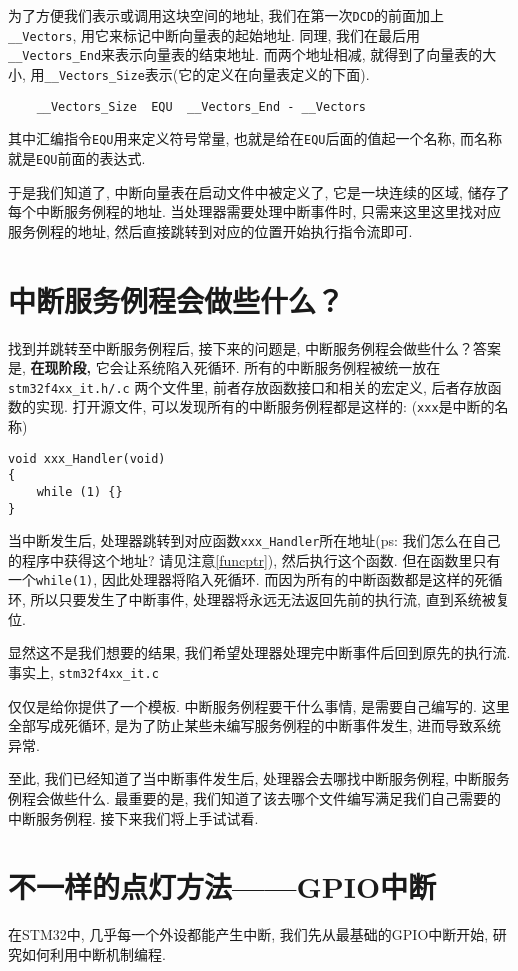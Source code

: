 为了方便我们表示或调用这块空间的地址, 我们在第一次\verb|DCD|的前面加上\verb|__Vectors|, 用它来标记中断向量表的起始地址. 同理, 我们在最后用\verb|__Vectors_End|来表示向量表的结束地址. 而两个地址相减, 就得到了向量表的大小, 用\verb|__Vectors_Size|表示(它的定义在向量表定义的下面).
\begin{lstlisting}
    __Vectors_Size  EQU  __Vectors_End - __Vectors
\end{lstlisting}
其中汇编指令\verb|EQU|用来定义符号常量, 也就是给在\verb|EQU|后面的值起一个名称, 而名称就是\verb|EQU|前面的表达式.

于是我们知道了, 中断向量表在启动文件中被定义了, 它是一块连续的区域, 储存了每个中断服务例程的地址. 当处理器需要处理中断事件时, 只需来这里这里找对应服务例程的地址, 然后直接跳转到对应的位置开始执行指令流即可.

\section{中断服务例程会做些什么？}
找到并跳转至中断服务例程后, 接下来的问题是, 中断服务例程会做些什么？答案是, \textbf{在现阶段,} 它会让系统陷入死循环. 所有的中断服务例程被统一放在 \verb|stm32f4xx_it.h/.c| 两个文件里, 前者存放函数接口和相关的宏定义, 后者存放函数的实现. 打开源文件, 可以发现所有的中断服务例程都是这样的:
(\verb|xxx|是中断的名称)
\begin{lstlisting}
void xxx_Handler(void)
{
    while (1) {}
}
\end{lstlisting}

当中断发生后, 处理器跳转到对应函数\verb|xxx_Handler|所在地址(ps: 我们怎么在自己的程序中获得这个地址? 请见注意\ref*{funcptr}), 然后执行这个函数. 但在函数里只有一个\verb|while(1)|, 因此处理器将陷入死循环. 而因为所有的中断函数都是这样的死循环, 所以只要发生了中断事件, 处理器将永远无法返回先前的执行流, 直到系统被复位.

显然这不是我们想要的结果, 我们希望处理器处理完中断事件后回到原先的执行流. 事实上, \verb|stm32f4xx_it.c|

\noindent 仅仅是给你提供了一个模板. 中断服务例程要干什么事情, 是需要自己编写的. 这里全部写成死循环, 是为了防止某些未编写服务例程的中断事件发生, 进而导致系统异常.

至此, 我们已经知道了当中断事件发生后, 处理器会去哪找中断服务例程, 中断服务例程会做些什么. 最重要的是, 我们知道了该去哪个文件编写满足我们自己需要的中断服务例程. 接下来我们将上手试试看.

\section{不一样的点灯方法——GPIO中断}
在STM32中, 几乎每一个外设都能产生中断, 我们先从最基础的GPIO中断开始, 研究如何利用中断机制编程.

